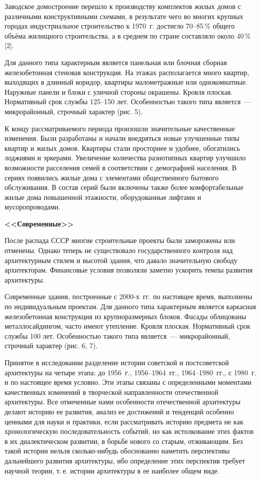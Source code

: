Заводское домостроение перешло к производству комплектов жилых домов с различными конструктивными схемами, в результате чего во многих крупных городах индустриальное строительство к 1970~г. достигло 70--85\,\% общего объёма жилищного строительства, а в среднем по стране составляло около 40\,\% [2].

Для данного типа характерным является панельная или блочная сборная железобетонная стеновая конструкция. На этажах располагается много квартир, выходящих в длинный коридор, квартиры малометражные или однокомнатные. Наружные панели и блоки с уличной стороны окрашены. Кровля плоская. Нормативный срок службы 125--150 лет. Особенностью такого типа является~--- микрорайонный, строчный характер (рис. 5).



К концу рассматриваемого периода произошли значительные качественные изменения. Были разработаны и начали внедряться новые улучшенные типы квартир и жилых домов. Квартиры стали просторнее и удобнее, обогатились лоджиями и эркерами. Увеличение количества разнотипных квартир улучшило возможности расселения семей в соответствии с демографией населения. В сериях появились жилые дома с элементами общественного бытового обслуживания. В состав серий были включены также более комфортабельные жилые дома повышенной этажности, оборудованные лифтами и мусоропроводами.

\textbf{<<Современные>>}

После распада СССР многие строительные проекты были заморожены или отменены. Однако теперь не существовало государственного контроля над архитектурным стилем и высотой здания, что давало значительную свободу архитекторам. Финансовые условия позволяли заметно ускорить темпы развития архитектуры.

Современные здания, построенные с 2000-х~гг. по настоящее время, выполнены по индивидуальным проектам. Для данного типа характерным является каркасная железобетонная конструкция из крупноразмерных блоков. Фасады облицованы металлосайдингом, часто имеют утепление. Кровля плоская. Нормативный срок службы 100 лет. Особенностью такого типа является~--- микрорайонный, строчный характер (рис. 6, 7).


\vspace{-12pt}
Принятое в исследовании разделение истории советской и постсоветской архитектуры на четыре этапа: до 1956~г., 1956--1964~гг., 1964--1980~гг., с 1980~г. и по настоящее время условно. Эти этапы связаны с определенными моментами качественных изменений в творческой направленности отечественной архитектуры. Все отмеченные нами особенности отечественной архитектуры делают историю ее развития, анализ ее достижений и тенденций особенно ценными для науки и практики, если рассматривать историю предмета не как хронологическую последовательность событий, но как истолкование этих фактов в их диалектическом развитии, в борьбе нового со старым, отживающим. Без такой истории нельзя сколько-нибудь обоснованно наметить перспективы дальнейшего развития архитектуры, ибо определение этих перспектив требует научной теории, т.\,е. истории архитектуры в ее наиболее общем виде.

